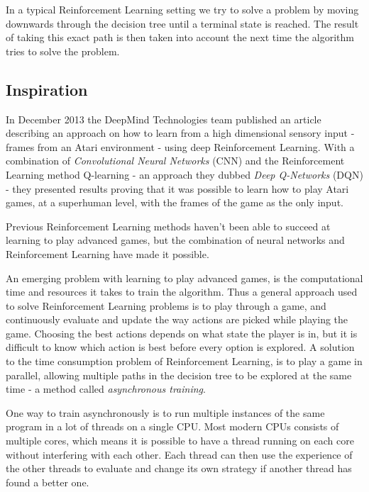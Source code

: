 \documentclass[11pt]{article}
\begin{document}
In a typical Reinforcement Learning setting we try to solve a problem
by moving downwards through the decision tree until a terminal state is reached.
The result of taking this exact path is then
taken into account the next time the algorithm tries to solve the problem.

\subsection{Inspiration}

In December 2013 the DeepMind Technologies team published an article
describing an approach on how to learn from a high dimensional sensory input -
frames from an Atari environment -
using deep Reinforcement Learning\cite{dqn}.
With a combination of \textit{Convolutional Neural Networks} (CNN) and
the Reinforcement Learning method Q-learning\cite{RLbook} - an approach they
dubbed \textit{Deep Q-Networks} (DQN) - they
presented results proving that it was possible to learn how to play Atari
games, at a superhuman level, with the frames of the game as the only input.

Previous Reinforcement Learning methods haven't been able to succeed at learning to play
advanced games, but the combination of neural networks and
Reinforcement Learning have made it possible.

An emerging problem with learning to play advanced games, is the computational time and
resources it takes to train the algorithm.
Thus a general approach used to solve Reinforcement Learning problems is to
play through a game, and continuously evaluate and update the way actions are picked
while playing the game.
Choosing the best actions depends on what state the player is in, but it is difficult to
know which action is best before every option is explored.
A solution to the time consumption problem of Reinforcement Learning,
is to play a game in parallel,
allowing multiple paths in the decision tree to be explored at the same time -
a method called \textit{asynchronous training}.


One way to train asynchronously is to run multiple instances of the same program
in a lot of threads on a single CPU.
Most modern CPUs consists of multiple cores, which means it is possible to have a thread
running on each core without interfering with each other.
Each thread can then use the experience of the other threads 
to evaluate and change its own strategy if another thread
has found a better one.
\end{document}
